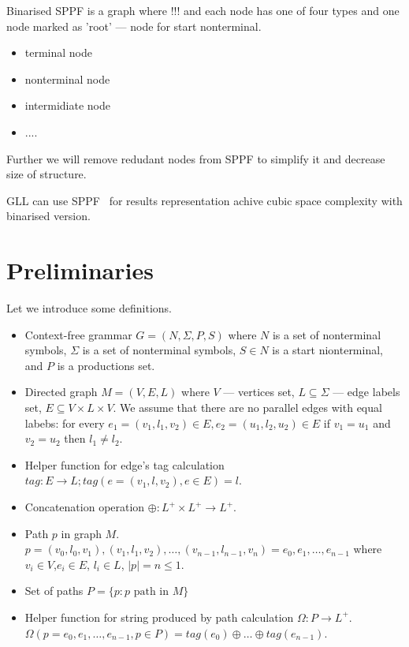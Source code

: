 \documentclass{sig-alternate} %
\begin{document}
Binarised SPPF is a graph where !!! and each node has one of four types and one node marked as 'root' --- node for start nonterminal.

\begin{itemize}
    \item terminal node
    \item nonterminal node
    \item intermidiate node
    \item ....
\end{itemize}

Further we will remove redudant nodes from SPPF to simplify it and decrease size of structure.

GLL can use SPPF~\cite{gllParsingTree} for results representation achive cubic space complexity with binarised version.


\section{Preliminaries}

Let we introduce some definitions.
\begin{itemize}
  \item Context-free grammar $G=(N, \Sigma, P, S)$ where $N$ is a set of nonterminal symbols, $\Sigma$ is a set of nonterminal symbols, $S \in N$ is a start nionterminal, and $P$ is a productions set. 
  \item Directed graph $M = (V,E,L)$ where $V$ --- vertices set, $L \subseteq \Sigma$ --- edge labels set, $E\subseteq V\times L\times V$. 
  We assume that there are no parallel edges with equal labebs: for every $e_1=(v_1,l_1,v_2) \in E, e_2=(u_1,l_2,u_2) \in E$ if $v_1 = u_1$ and $v_2 = u_2$ then $l_1 \neq l_2$.
  \item Helper function for edge's tag calculation $tag: E \rightarrow L; tag(e = (v_1,l,v_2), e \in E) = l$.
  \item Concatenation operation $\oplus: L^+ \times L^+ \rightarrow L^+$.
  \item Path $p$ in graph $M$. \\ $p = (v_0,l_0,v_1),(v_1,l_1,v_2),\dots,(v_{n-1},l_{n-1},v_n) = e_0,e_1,\dots,e_{n-1}$ where $v_i \in V$,$e_i \in E$, $l_i \in L$, $|p| = n \leq 1$. 
  \item Set of paths $P = \{p: p \text{ path in } M\}$
  \item Helper function for string produced by path calculation $\Omega: P \rightarrow L^+$.\\ $\Omega(p = e_0,e_1,\dots,e_{n-1}, p \in P) = tag (e_0) \oplus \dots \oplus tag (e_{n-1})$.
\end{itemize}
\end{document}
